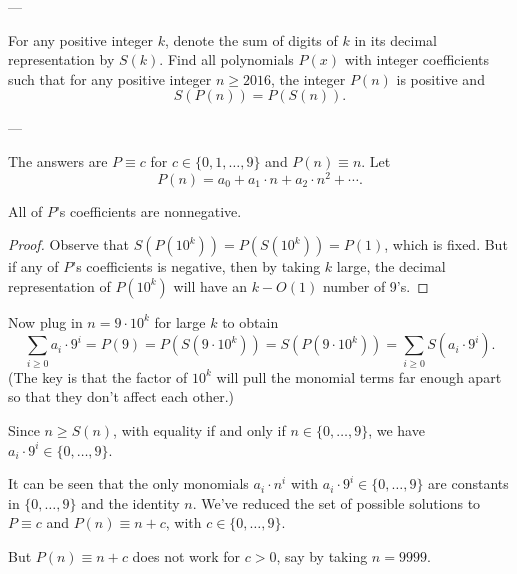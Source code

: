 
---

For any positive integer $k$, denote the sum of digits of $k$ in its decimal representation by $S(k)$. Find all polynomials $P(x)$ with integer coefficients such that for any positive integer $n\ge2016$, the integer $P(n)$ is positive and
\[S(P(n))=P(S(n)).\]

---

The answers are $P\equiv c$ for $c\in\{0,1,\ldots,9\}$ and $P(n)\equiv n$. Let
\[P(n)=a_0+a_1\cdot n+a_2\cdot n^2+\cdots.\]
\begin{claim*}
    All of $P$'s coefficients are nonnegative.
\end{claim*}
\begin{proof}
    Observe that $S(P(10^k))=P(S(10^k))=P(1)$, which is fixed. But if any of $P$'s coefficients is negative, then by taking $k$ large, the decimal representation of $P(10^k)$ will have an $k-O(1)$ number of 9's.
\end{proof}

Now plug in $n=9\cdot10^k$ for large $k$ to obtain
\[\sum_{i\ge0}a_i\cdot9^i=P(9)=P(S(9\cdot10^k))=S(P(9\cdot10^k))=\sum_{i\ge0}S(a_i\cdot 9^i).\]
(The key is that the factor of $10^k$ will pull the monomial terms far enough apart so that they don't affect each other.)

Since $n\ge S(n)$, with equality if and only if $n\in\{0,\ldots,9\}$, we have $a_i\cdot9^i\in\{0,\ldots,9\}$.

It can be seen that the only monomials $a_i\cdot n^i$ with $a_i\cdot9^i\in\{0,\ldots,9\}$ are constants in $\{0,\ldots,9\}$ and the identity $n$. We've reduced the set of possible solutions to $P\equiv c$ and $P(n)\equiv n+c$, with $c\in\{0,\ldots,9\}$.

But $P(n)\equiv n+c$ does not work for $c>0$, say by taking $n=9999$.

